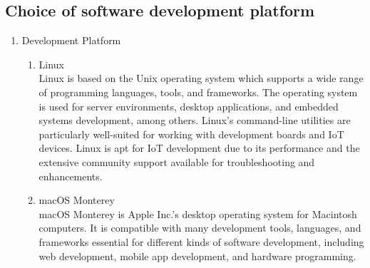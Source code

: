 \documentclass[conference]{IEEEtran}
\begin{document}
\subsection{\large{Choice of software development platform}}
\begin{enumerate}[label=\arabic*.]
\item Development Platform\\
\begin{enumerate}[label=\alph*.]
\item Linux\\
Linux is based on the Unix operating system which supports a wide range of programming languages, tools, and frameworks. The operating system is used for server environments, desktop applications, and embedded systems development, among others. Linux's command-line utilities are particularly well-suited for working with development boards and IoT devices. Linux is apt for IoT development due to its performance and the extensive community support available for troubleshooting and enhancements.\\
\item macOS Monterey\\
macOS Monterey is Apple Inc.'s desktop operating system for Macintosh computers. It is compatible with many development tools, languages, and frameworks essential for different kinds of software development, including web development, mobile app development, and hardware programming.\\
\end{enumerate}


\end{enumerate}
\end{document}
